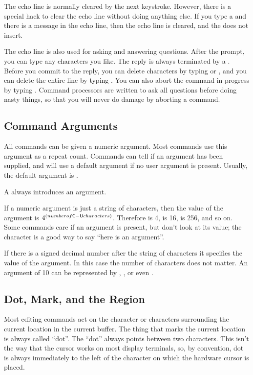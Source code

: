 The echo line is normally cleared by the next keystroke.
However, there is a special hack to clear the echo line without
doing anything else. If you type a  and there is a message in the
echo line, then the echo line is cleared, and the  does not
insert.

The echo line is also used for asking and answering questions.
After the
prompt, you can type any characters you like. The reply is always
terminated by a . Before you commit to the reply, you can delete
characters by typing  or , and you can delete the
entire line by typing .
You can also abort the command in progress by typing .
Command processors are written to ask all questions before doing nasty
things, so that you will never do damage by aborting a command.
\subsection{Command Arguments}
All commands can be given a numeric argument. Most commands use this
argument as a repeat count. Commands can tell if an argument has been
supplied, and will use a default argument if no user argument is present.
Usually, the default argument is .

A  always introduces an argument.

If a numeric argument is just a string of  characters, then the
value of the argument is
$4^{(number of {\sf C-U} characters)}$.
Therefore  is 4,  is 16,
 is 256, and so on.
Some commands
care if an argument is present, but don't look at its value; the 
character is a good way to say ``here is an argument''.

If there is a signed decimal number after the string of
 characters it specifies the value of the argument. In this case
the number of  characters does not matter. An argument of 10 can be
represented by ,
, or even .
\subsection{Dot, Mark, and the Region}
Most editing commands act on the character or characters surrounding
the current location in the current buffer. The thing that marks the current
location is always called ``dot''. The ``dot'' always points between two
characters. This isn't the way that the cursor works on most display terminals,
so, by convention, dot is always immediately to the left of the character
on which the hardware cursor is placed.

